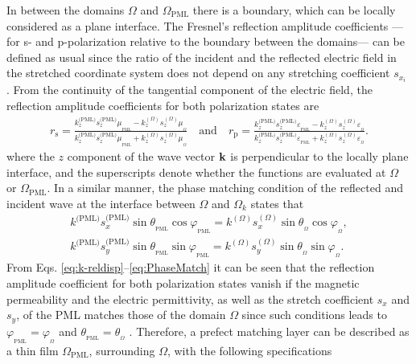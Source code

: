     In between the domains $\Omega$ and $\Omega_\text{PML}$ there is a boundary, which can be locally considered as a plane interface. The Fresnel's reflection amplitude coefficients ---for s- and p-polarization relative to the boundary between the domains--- can be defined as usual since the ratio of the incident and the reflected electric field in the stretched coordinate system does not depend on any stretching coefficient $s_{x_i}$ \cite{jin_theory_2010,chew_complex_1997}. From the continuity of the tangential component of the electric field, the reflection amplitude coefficients for both polarization states are \cite{jackson_classical_1999}
    \begin{align}
       r_\text{s} = \frac{k^\text{(PML)}_z s^\text{(PML)}_z\mu_{{}_\text{PML}} - k^{(\Omega)}_z s^{(\Omega)}_z\mu_{{}_\Omega}}
                        {k^\text{(PML)}_z s^\text{(PML)}_z\mu_{{}_\text{PML}} + k^{(\Omega)}_z s^{(\Omega)}_z\mu_{{}_\Omega}}
           \quad
           \text{and}
           \quad
       r_\text{p} = \frac{k^\text{(PML)}_z s^\text{(PML)}_z\varepsilon_{{}_\text{PML}} - k^{(\Omega)}_z s^{(\Omega)}_z\varepsilon_{{}_\Omega}}
                        {k^\text{(PML)}_z s^\text{(PML)}_z\varepsilon_{{}_\text{PML}} + k^{(\Omega)}_z s^{(\Omega)}_z\varepsilon_{{}_\Omega}}.
       \label{eq:refl-Fresnel}
    \end{align}
   where the $z$ component of the wave vector $\vb{k}$ is perpendicular to the locally plane interface, and the superscripts denote whether the functions are evaluated at $\Omega$ or $\Omega_\text{PML}$. In a similar manner, the phase matching condition of the reflected and incident wave at the interface between $\Omega$ and $\Omega_k$ states that \cite{jin_theory_2010}
   \begin{subequations}
       \label{eq:PhaseMatch}
    \begin{align}
       k^\text{(PML)} s^\text{(PML)}_x \sin\theta_{{}_\text{PML}}\cos\varphi_{{}_\text{PML}} =
                        k^{(\Omega)} s^{(\Omega)}_x \sin\theta_{{}_\Omega}\cos\varphi_{{}_\Omega},\\
        k^\text{(PML)} s^\text{(PML)}_y \sin\theta_{{}_\text{PML}}\sin\varphi_{{}_\text{PML}} =
                     k^{(\Omega)} s^{(\Omega)}_y \sin\theta_{{}_\Omega}\sin\varphi_{{}_\Omega}.
    \end{align}
    \end{subequations}
    \noindent
   From Eqs. \eqref{eq:k-reldisp}--\eqref{eq:PhaseMatch} it can be seen that the reflection amplitude coefficient for both polarization states vanish if the magnetic permeability and the electric permittivity, as well as the stretch coefficient $s_x$ and $s_y$, of the PML matches those of the domain $\Omega$ since such conditions leads to  $\varphi_{{}_\text{PML}} = \varphi_{{}_\Omega}$ and  $\theta_{{}_\text{PML}} = \theta_{{}_\Omega}$ \cite{jin_theory_2010}. Therefore, a prefect matching layer can be described as a thin film $\Omega_\text{PML}$, surrounding $\Omega$, with the following specifications
